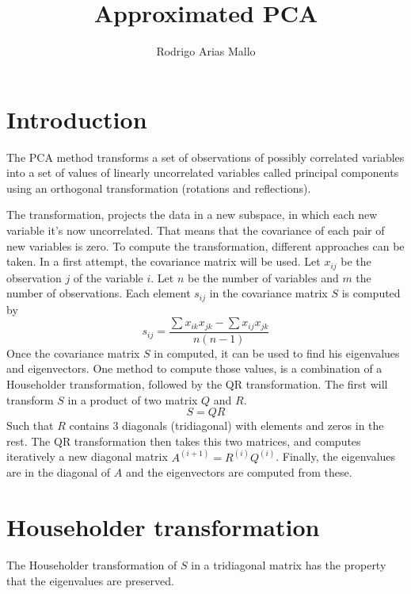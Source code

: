 \documentclass[11pt,a4paper]{article}
\title{Approximated PCA}
\author{Rodrigo Arias Mallo}
\begin{document}
\maketitle

\section{Introduction}

The PCA method transforms a set of observations of possibly correlated variables 
into a set of values of linearly uncorrelated variables called principal 
components using an orthogonal transformation (rotations and reflections).

The transformation, projects the data in a new subspace, in which each new 
variable it's now uncorrelated. That means that the covariance of each pair of 
new variables is zero.
%
To compute the transformation, different approaches can be taken. In a first 
attempt, the covariance matrix will be used.
%
Let $x_{ij}$ be the observation $j$ of the variable $i$. Let $n$ be the number 
of variables and $m$ the number of observations.
%
Each element $s_{ij}$ in the covariance matrix $S$ is computed by
%
$$ s_{ij} = \frac{\sum x_{ik} x_{jk} - \sum x_{ij} x_{jk}}{n (n-1)} $$
%
Once the covariance matrix $S$ in computed, it can be used to find his 
eigenvalues and eigenvectors. One method to compute those values, is a 
combination of a Householder transformation, followed by the QR transformation.  
The first will transform $S$ in a product of two matrix $Q$ and $R$.
%
	$$ S = QR $$
%
Such that $R$ contains 3 diagonals (tridiagonal) with elements and zeros in the 
rest. The QR transformation then takes this two matrices, and computes 
iteratively a new diagonal matrix $A^{(i+1)} = R^{(i)} Q^{(i)}$. Finally, the 
eigenvalues are in the diagonal of $A$ and the eigenvectors are computed from 
these.

\section{Householder transformation}

The Householder transformation of $S$ in a tridiagonal matrix has the property 
that the eigenvalues are preserved.
\end{document}
